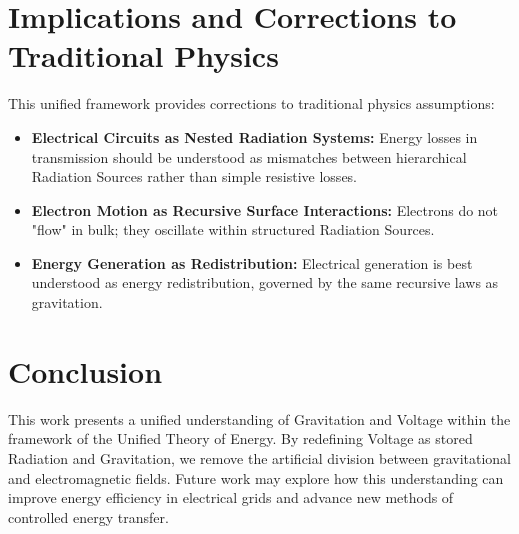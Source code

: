 \documentclass{article}
\begin{document}
\section{Implications and Corrections to Traditional Physics}
This unified framework provides corrections to traditional physics assumptions:
\begin{itemize}
    \item \textbf{Electrical Circuits as Nested Radiation Systems:} Energy losses in transmission should be understood as mismatches between hierarchical Radiation Sources rather than simple resistive losses.
    \item \textbf{Electron Motion as Recursive Surface Interactions:} Electrons do not "flow" in bulk; they oscillate within structured Radiation Sources.
    \item \textbf{Energy Generation as Redistribution:} Electrical generation is best understood as energy redistribution, governed by the same recursive laws as gravitation.
\end{itemize}

\section{Conclusion}
This work presents a unified understanding of Gravitation and Voltage within the framework of the Unified Theory of Energy. By redefining Voltage as stored Radiation and Gravitation, we remove the artificial division between gravitational and electromagnetic fields. Future work may explore how this understanding can improve energy efficiency in electrical grids and advance new methods of controlled energy transfer.
\end{document}
